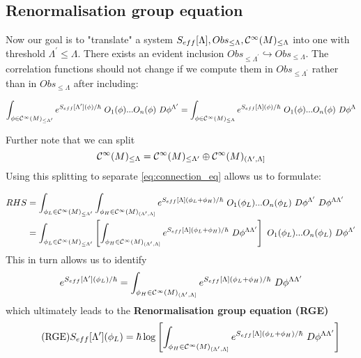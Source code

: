 \subsection{Renormalisation group equation}
\label{subsec:renorm_group_eq}

Now our goal is to "translate" a system $S_{eff}[\Lambda], Obs_{\leq \Lambda}, \mathcal{C}^{\infty}(M)_{\leq \Lambda}$ into one with threshold $\Lambda^\prime \leq \Lambda$. There exists an evident inclusion $Obs_{\leq \Lambda^\prime} \hookrightarrow Obs_{\leq \Lambda}$. The correlation functions should not change if we compute them in $Obs_{\leq \Lambda^\prime}$ rather than in $Obs_{\leq \Lambda}$ after including:

\begin{align}
\label{eq:connection_eq}
  \int_{\phi \in \Ci(M)_{\leq \Lambda^\prime}} e^{S_{eff}[\Lambda^\prime] (\phi) / \hbar} \ O_1(\phi) ... O_n(\phi) \ D\phi^{\Lambda^\prime} = \int_{\phi \in \Ci(M)_{\leq \Lambda}} e^{S_{eff}[\Lambda] (\phi) / \hbar} \ O_1(\phi) ... O_n(\phi) \ D\phi^{\Lambda}
\end{align}

Further note that we can split
$$ \mathcal{C}^{\infty}(M)_{\leq \Lambda} = \mathcal{C}^{\infty}(M)_{\leq \Lambda^\prime} \oplus \mathcal{C}^{\infty}(M)_{(\Lambda^\prime,\Lambda]} $$
Using this splitting to separate \eqref{eq:connection_eq} allows us to formulate:

\begin{align}
  RHS &= \int_{\phi_L \in \Ci(M)_{\leq \Lambda^\prime}}
  \int_{\phi_H \in \Ci(M)_{(\Lambda^\prime,\Lambda]}}
  e^{S_{eff}[\Lambda] (\phi_L + \phi_H) / \hbar} \ O_1(\phi_L) ... O_n(\phi_L) \ D\phi^{\Lambda^\prime} \ D\phi^{\Lambda \Lambda^\prime} \\
  &= \int_{\phi_L \in \Ci(M)_{\leq \Lambda^\prime}}
  \left [\int_{\phi_H \in \Ci(M)_{(\Lambda^\prime,\Lambda]}}
  e^{S_{eff}[\Lambda] (\phi_L + \phi_H) / \hbar} \ D\phi^{\Lambda \Lambda^\prime} \right] \ O_1(\phi_L) ... O_n(\phi_L) \ D\phi^{\Lambda^\prime} \\
\end{align}
This in turn allows us to identify
$$ e^{S_{eff}[\Lambda^\prime](\phi_L)/\hbar}
= \int_{\phi_H \in \Ci(M)_{(\Lambda^\prime,\Lambda]}}
e^{S_{eff}[\Lambda] (\phi_L + \phi_H) / \hbar} \ D\phi^{\Lambda \Lambda^\prime} $$
which ultimately leads to the \textbf{Renormalisation group equation (RGE)}
\begin{align}
\label{eq:RGE}\tag{RGE}
  S_{eff}[\Lambda^\prime](\phi_L)
  = \hbar \log \left[ \int_{\phi_H \in \Ci(M)_{(\Lambda^\prime,\Lambda]}}
  e^{S_{eff}[\Lambda] (\phi_L + \phi_H) / \hbar} \ D\phi^{\Lambda \Lambda^\prime} \right]
\end{align}

